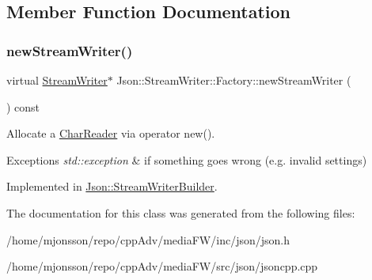 \subsection{Member Function Documentation}
\mbox{\label{classJson_1_1StreamWriter_1_1Factory_a9d30ec53e8288cd53befccf1009c5f31}} 
\subsubsection{\texorpdfstring{new\+Stream\+Writer()}{newStreamWriter()}}
{\footnotesize\ttfamily virtual \hyperlink{classJson_1_1StreamWriter}{Stream\+Writer}$\ast$ Json\+::\+Stream\+Writer\+::\+Factory\+::new\+Stream\+Writer (\begin{DoxyParamCaption}{ }\end{DoxyParamCaption}) const\hspace{0.3cm}{\ttfamily [pure virtual]}}



Allocate a \hyperlink{classJson_1_1CharReader}{Char\+Reader} via operator new(). 


\begin{DoxyExceptions}{Exceptions}
{\em std\+::exception} & if something goes wrong (e.\+g. invalid settings) \\
\hline
\end{DoxyExceptions}


Implemented in \hyperlink{classJson_1_1StreamWriterBuilder_ab9ee278609f88ae04a7c1a84e1f559e6}{Json\+::\+Stream\+Writer\+Builder}.



The documentation for this class was generated from the following files\+:\begin{DoxyCompactItemize}
\item 
/home/mjonsson/repo/cpp\+Adv/media\+F\+W/inc/json/json.\+h\item 
/home/mjonsson/repo/cpp\+Adv/media\+F\+W/src/json/jsoncpp.\+cpp\end{DoxyCompactItemize}

